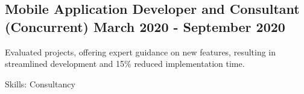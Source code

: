 \subsection{{Mobile Application Developer and Consultant (Concurrent) \hfill March 2020 - September 2020}}
\begin{zitemize}


\item Evaluated projects, offering expert guidance on new features, resulting in streamlined development and 15\% reduced implementation time.

\item[] Skills: Consultancy
\end{zitemize}